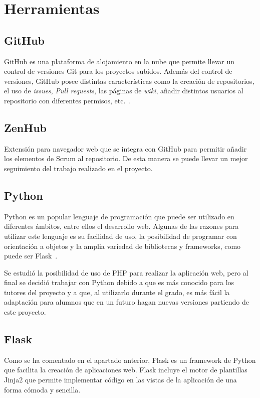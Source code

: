  
\section{Herramientas}
\subsection{GitHub}
GitHub es una plataforma de alojamiento en la nube que permite llevar un control de versiones Git para los proyectos subidos. Además del control de versiones, GitHub posee distintas características como la creación de repositorios, el uso de \textit{issues}, \textit{Pull requests}, las páginas de \textit{wiki}, añadir distintos usuarios al repositorio con diferentes permisos, etc.~\cite{wiki:github}.

\subsection{ZenHub}
Extensión para navegador web que se integra con GitHub para permitir añadir los elementos de Scrum al repositorio. De esta manera se puede llevar un mejor seguimiento del trabajo realizado en el proyecto.

\subsection{Python}
Python es un popular lenguaje de programación que puede ser utilizado en diferentes ámbitos, entre ellos el desarrollo web. Algunas de las razones para utilizar este lenguaje es su facilidad de uso, la posibilidad de programar con orientación a objetos y la amplia variedad de bibliotecas y frameworks, como puede ser Flask~\cite{python}.

Se estudió la posibilidad de uso de PHP para realizar la aplicación web, pero al final se decidió trabajar con Python debido a que es más conocido para los tutores del proyecto y a que, al utilizarlo durante el grado, es más fácil la adaptación para alumnos que en un futuro hagan nuevas versiones partiendo de este proyecto.

\subsection{Flask}
Como se ha comentado en el apartado anterior, Flask es un framework de Python que facilita la creación de aplicaciones web. Flask incluye el motor de plantillas Jinja2 que permite implementar código en las vistas de la aplicación de una forma cómoda y sencilla.

